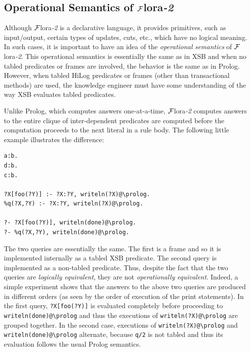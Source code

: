 \documentclass[11pt]{article}
\newcommand{\FLORA}{{\mbox{\sc ${\cal F}${lora}\rm\emph{-2}}}\xspace}
\newcommand{\FLSYSTEM}{\FLORA}
\newcommand{\bs}{\textbackslash}
\begin{document}
\ifdef{\isfloraman}{}
{
    
}

\subsection{Operational Semantics of \FLSYSTEM}\label{sec-flora-operational}

Although \FLSYSTEM is a declarative language, it provides primitives, such as
input/output, certain types of updates, cuts, etc., which have no logical
meaning. In such cases, it is important to have an idea of the
\emph{operational semantics} of \FLSYSTEM. This operational semantics is
essentially the same as in XSB and when no tabled predicates or frames
are involved, the behavior is the same as in Prolog. However, when tabled
HiLog predicates or frames (other than transactional methods) are used,
the knowledge engineer must have some understanding of the way XSB evaluates tabled
predicates.

Unlike Prolog, which computes answers one-at-a-time, \FLSYSTEM computes
answers to the entire clique of inter-dependent
predicates are computed before the computation proceeds to the next literal
in a rule body. The following little example illustrates the difference:
\begin{verbatim}
a:b.
d:b.
c:b.

?X[foo(?Y)] :- ?X:?Y, writeln(?X)@\prolog.
%q(?X,?Y) :- ?X:?Y, writeln(?X)@\prolog.

?- ?X[foo(?Y)], writeln(done)@\prolog.
?- %q(?X,?Y), writeln(done)@\prolog.
\end{verbatim}
The two queries are essentially the same. The first is a frame
and so it is implemented internally as a tabled XSB predicate. The
second query is implemented as a non-tabled predicate.  Thus, despite
the fact that the two queries are \emph{logically equivalent}, they are
not \emph{operationally equivalent}.  Indeed, a
simple experiment shows that the answers to the above two queries are
produced in different orders (as seen by the order of execution of the
print statements).  In the first query, \verb|?X[foo(?Y)]| is evaluated
completely before proceeding to {\tt writeln(done)@\bs{}prolog} and thus
the executions of {\tt writeln(?X)@\bs{}prolog} are grouped together. In the
second case, executions of {\tt writeln(?X)@\bs{}prolog} and {\tt
writeln(done)@\bs{}prolog} alternate, because {\tt \verb|q|/2} is not tabled
and thus its evaluation follows the usual Prolog semantics.
\end{document}
